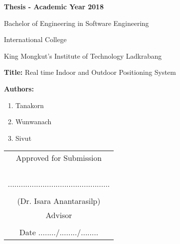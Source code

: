 
\begin{flushleft}
\vspace{24pt}
\par \textbf{{\normalsize Thesis - Academic Year 2018}}\newline
\noindent\par Bachelor of Engineering in Software Engineering
\noindent\par International College
\noindent\par King Mongkut's Institute of Technology Ladkrabang
\newline
\noindent\par \textbf{Title:} Real time Indoor and Outdoor Positioning System \\ \hspace{1.2cm}  
\newline
\noindent\par \textbf{\normalsize Authors:}
\begin{enumerate}
	\item Tanakorn  
	\item Wunwanach   
	\item Sivut  
\end{enumerate}
\hfill\newline
\hfill\newline
\hfill\newline
\hfill\newline
\hfill\newline
\hfill\newline
\hfill\newline
\hfill\newline
\hfill\newline
\hfill\newline
\begin{table}[h]
	\begin{flushright}
		\begin{tabular}{c}
		Approved for Submission									\\
														\\
														\\
														\\
														\\
		...............................................							\\
														\\
		(Dr. Isara Anantarasilp)								\\
		Advisor											\\
														\\
		Date ......../......../........								\\
		\end{tabular}
	\end{flushright}
\end{table}
\thispagestyle{empty}
\end{flushleft}